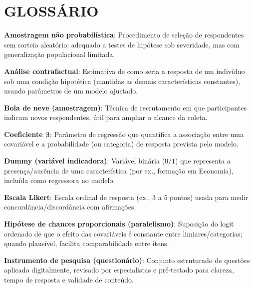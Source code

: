 






\chapter*{GLOSSÁRIO}

{ \setlength{\parindent}{0pt} %

\textbf{Amostragem não probabilística}: Procedimento de seleção de respondentes sem sorteio aleatório; adequado a testes de hipótese sob severidade, mas com generalização populacional limitada. 

\textbf{Análise contrafactual}: Estimativa de como seria a resposta de um indivíduo sob uma condição hipotética (mantidas as demais características constantes), usando parâmetros de um modelo ajustado.

\textbf{Bola de neve (amostragem)}: Técnica de recrutamento em que participantes indicam novos respondentes, útil para ampliar o alcance da coleta.

\textbf{Coeficiente $\boldsymbol\beta$}: Parâmetro de regressão que quantifica a associação entre uma covariável e a probabilidade (ou categoria) de resposta prevista pelo modelo.

\textbf{Dummy (variável indicadora)}: Variável binária ($0/1$) que representa a presença/ausência de uma característica (por ex., formação em Economia), incluída como regressora no modelo.

\textbf{Escala Likert}: Escala ordinal de resposta (ex., 3 a 5 pontos) usada para medir concordância/discordância com afirmações.

\textbf{Hipótese de chances proporcionais (paralelismo)}: Suposição do logit ordenado de que o efeito das covariáveis é constante entre limiares/categorias; quando plausível, facilita comparabilidade entre itens.

\textbf{Instrumento de pesquisa (questionário)}: Conjunto estruturado de questões aplicado digitalmente, revisado por especialistas e pré-testado para clareza, tempo de resposta e validade de conteúdo.

}
